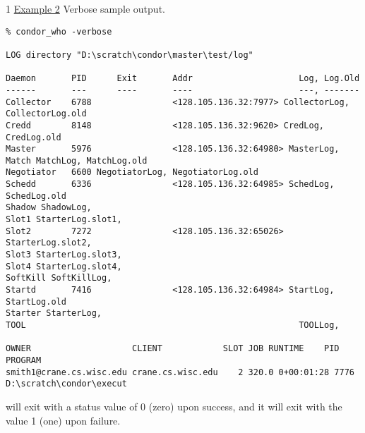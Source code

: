 \begin{ManPage}{\label{man-condor-who}}{1}
\underline{Example 2} Verbose sample output.
\footnotesize
\begin{verbatim}
% condor_who -verbose

LOG directory "D:\scratch\condor\master\test/log"

Daemon       PID      Exit       Addr                     Log, Log.Old
------       ---      ----       ----                     ---, -------
Collector    6788                <128.105.136.32:7977> CollectorLog, CollectorLog.old
Credd        8148                <128.105.136.32:9620> CredLog, CredLog.old
Master       5976                <128.105.136.32:64980> MasterLog,
Match MatchLog, MatchLog.old
Negotiator   6600 NegotiatorLog, NegotiatorLog.old
Schedd       6336                <128.105.136.32:64985> SchedLog, SchedLog.old
Shadow ShadowLog,
Slot1 StarterLog.slot1,
Slot2        7272                <128.105.136.32:65026> StarterLog.slot2,
Slot3 StarterLog.slot3,
Slot4 StarterLog.slot4,
SoftKill SoftKillLog,
Startd       7416                <128.105.136.32:64984> StartLog, StartLog.old
Starter StarterLog,
TOOL                                                      TOOLLog,

OWNER                    CLIENT            SLOT JOB RUNTIME    PID    PROGRAM
smith1@crane.cs.wisc.edu crane.cs.wisc.edu    2 320.0 0+00:01:28 7776 D:\scratch\condor\execut
\end{verbatim}
\normalsize

\ExitStatus

 will exit with a status value of 0 (zero) upon success,
and it will exit with the value 1 (one) upon failure.

\end{ManPage}

